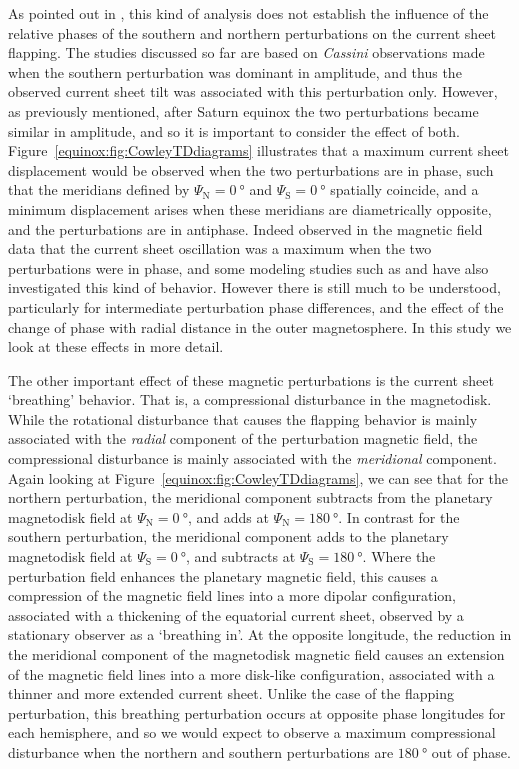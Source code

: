 As pointed out in \citet{provan2009}, this kind of analysis does not establish the influence of the relative phases of the southern and northern perturbations on the current sheet flapping. The studies discussed so far are based on \textit{Cassini} observations made when the southern perturbation was dominant in amplitude, and thus the observed current sheet tilt was associated with this perturbation only. However, as previously mentioned, after Saturn equinox the two perturbations became similar in amplitude, and so it is important to consider the effect of both. Figure~\ref{equinox:fig:CowleyTDdiagrams} illustrates that a maximum current sheet displacement would be observed when the two perturbations are in phase, such that the meridians defined by $\Psi_\mathrm{N} = \SI{0}{\degree}$ and $\Psi_\mathrm{S} = \SI{0}{\degree}$ spatially coincide, and a minimum displacement arises when these meridians are diametrically opposite, and the perturbations are in antiphase. Indeed \citet{provan2012} observed in the magnetic field data that the current sheet oscillation was a maximum when the two perturbations were in phase, and some modeling studies such as \citet{jiaandkivelson2012} and \citet{cowley2017a} have also investigated this kind of behavior. However there is still much to be understood, particularly for intermediate perturbation phase differences, and the effect of the change of phase with radial distance in the outer magnetosphere. In this study we look at these effects in more detail.

The other important effect of these magnetic perturbations is the current sheet `breathing' behavior. That is, a compressional disturbance in the magnetodisk. While the rotational disturbance that causes the flapping behavior is mainly associated with the \textit{radial} component of the perturbation magnetic field, the compressional disturbance is mainly associated with the \textit{meridional} component. Again looking at Figure~\ref{equinox:fig:CowleyTDdiagrams}, we can see that for the northern perturbation, the meridional component subtracts from the planetary magnetodisk field at $\Psi_\mathrm{N} = \SI{0}{\degree}$, and adds at $\Psi_\mathrm{N} = \SI{180}{\degree}$. In contrast for the southern perturbation, the meridional component adds to the planetary magnetodisk field at $\Psi_\mathrm{S} = \SI{0}{\degree}$, and subtracts at $\Psi_\mathrm{S} = \SI{180}{\degree}$. Where the perturbation field enhances the planetary magnetic field, this causes a compression of the magnetic field lines into a more dipolar configuration, associated with a thickening of the equatorial current sheet, observed by a stationary observer as a `breathing in'. At the opposite longitude, the reduction in the meridional component of the magnetodisk magnetic field causes an extension of the magnetic field lines into a more disk-like configuration, associated with a thinner and more extended current sheet. Unlike the case of the flapping perturbation, this breathing perturbation occurs at opposite phase longitudes for each hemisphere, and so we would expect to observe a maximum compressional disturbance when the northern and southern perturbations are $\SI{180}{\degree}$ out of phase.

